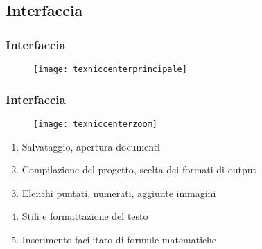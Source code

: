 \subsection{Interfaccia}
\begin{frame}
  \frametitle{Interfaccia}
  
  \begin{figure}
   \centering
   \texttt{[image: texniccenterprincipale]}
  \end{figure}
\end{frame}


\begin{frame}
  \frametitle{Interfaccia}
  
  \begin{figure}
   \centering
   \texttt{[image: texniccenterzoom]}
  \end{figure}
  
  \begin{enumerate}
   \item Salvataggio, apertura documenti
   \item Compilazione del progetto, scelta dei formati di output
   \item Elenchi puntati, numerati, aggiunte immagini
   \item Stili e formattazione del testo
   \item Inserimento facilitato di formule matematiche
  \end{enumerate}

\end{frame}
